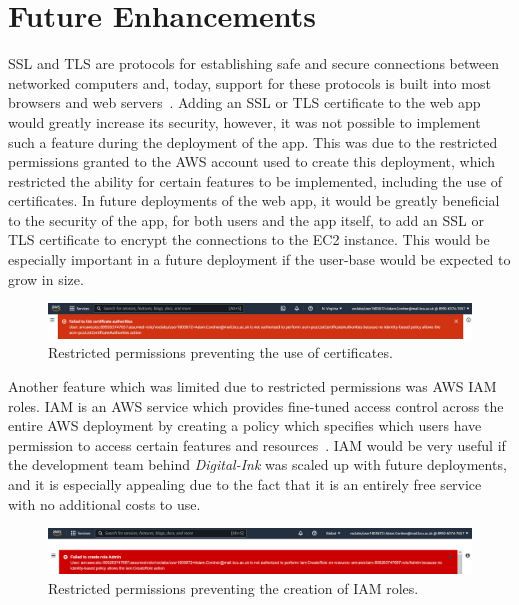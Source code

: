 \chapter{Future Enhancements}\label{ch:future-enhancements}

SSL and TLS are protocols for establishing safe and secure connections between networked computers and, today, support
for these protocols is built into most browsers and web servers~\parencite{thomas2000ssl}.
Adding an SSL or TLS certificate to the web app would greatly increase its security, however, it was not possible to
implement such a feature during the deployment of the app.
This was due to the restricted permissions granted to the AWS account used to create this deployment, which
restricted the ability for certain features to be implemented, including the use of certificates.
In future deployments of the web app, it would be greatly beneficial to the security of the app, for both users and the
app itself, to add an SSL or TLS certificate to encrypt the connections to the EC2 instance.
This would be especially important in a future deployment if the user-base would be expected to grow in size.

\begin{figure}[!htbp]
    \centering
    \includegraphics[width=\textwidth]{resources/certificate-denied}
    \caption{Restricted permissions preventing the use of certificates.}
    \label{fig:certificate-denied}
\end{figure}

Another feature which was limited due to restricted permissions was AWS IAM roles.
IAM is an AWS service which provides fine-tuned access control across the entire AWS deployment by creating a policy
which specifies which users have permission to access certain features and resources~\parencite{amazon2022aws2}.
IAM would be very useful if the development team behind \textit{Digital-Ink} was scaled up with future
deployments, and it is especially appealing due to the fact that it is an entirely free service with no additional
costs to use.

\begin{figure}[!htbp]
    \centering
    \includegraphics[width=\textwidth]{resources/iam-denied}
    \caption{Restricted permissions preventing the creation of IAM roles.}
    \label{fig:iam-denied}
\end{figure}

